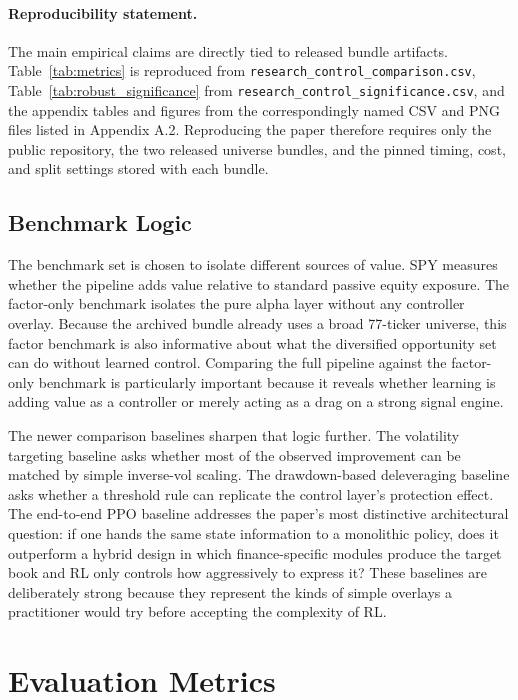 \documentclass[10pt,twocolumn]{article}
\begin{document}
\paragraph{Reproducibility statement.}
The main empirical claims are directly tied to released bundle artifacts.
Table~\ref{tab:metrics} is reproduced from
\texttt{research\_control\_comparison.csv},
Table~\ref{tab:robust_significance} from
\texttt{research\_control\_significance.csv}, and the appendix tables and
figures from the correspondingly named CSV and PNG files listed in Appendix
A.2. Reproducing the paper therefore requires only the public repository, the
two released universe bundles, and the pinned timing, cost, and split settings
stored with each bundle.

\subsection{Benchmark Logic}

The benchmark set is chosen to isolate different sources of value. SPY measures
whether the pipeline adds value relative to standard passive equity exposure.
The factor-only benchmark isolates the pure alpha layer without any controller
overlay. Because the archived bundle already uses a broad 77-ticker universe,
this factor benchmark is also informative about what the diversified opportunity
set can do without learned control. Comparing the full pipeline against the
factor-only benchmark is particularly important because it reveals whether
learning is adding value as a controller or merely acting as a drag on a strong
signal engine.

The newer comparison baselines sharpen that logic further. The volatility
targeting baseline asks whether most of the observed improvement can be matched
by simple inverse-vol scaling. The drawdown-based deleveraging baseline asks
whether a threshold rule can replicate the control layer's protection effect.
The end-to-end PPO baseline addresses the paper's most distinctive
architectural question: if one hands the same state information to a monolithic
policy, does it outperform a hybrid design in which finance-specific modules
produce the target book and RL only controls how aggressively to express it?
These baselines are deliberately strong because they represent the kinds of
simple overlays a practitioner would try before accepting the complexity of RL.

\section{Evaluation Metrics}
\end{document}
